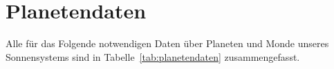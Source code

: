 \documentclass[a4paper,12pt]{scrartcl}
\begin{document}
%
\section{Planetendaten}
Alle für das Folgende notwendigen Daten über Planeten und
Monde unseres Sonnensystems sind in Tabelle~\ref{tab:planetendaten}
zusammengefasst.
%
%
%
%
%
\end{document}
